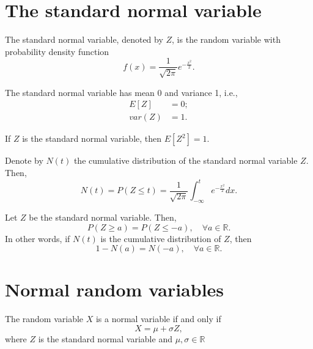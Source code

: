 \section{The standard normal variable}
The standard normal variable, denoted by $ Z $, is the random variable with
    probability density function
\begin{equation}
    f(x) = \frac{1}{\sqrt{2 \pi}} e^{-\frac{x^2}{2}}.
    \label{eq:standard-pdf}
\end{equation}

\begin{lemma}
    The standard normal variable has mean 0 and variance 1, i.e.,
    \begin{align}
        E[Z] &= 0; \label{eq:standard-expected-value} \\
        var(Z) &= 1. \label{eq:standard-variance}
    \end{align}
\end{lemma}

\begin{lemma}
    If $ Z $ is the standard normal variable, then $ E[Z^2] = 1 $.
\end{lemma}

\begin{definition}
    Denote by $ N(t) $ the cumulative distribution of the standard normal
        variable $ Z $.
    Then,
    \begin{equation}
        N(t) = P(Z \leq t) = \frac{1}{\sqrt{2 \pi}} \int_{-\infty}^{t}
            e^{-\frac{x^2}{2}} dx.
    \end{equation}
\end{definition}

\begin{lemma}\label{lemma:standard-normal-distribution-symmetry}
    Let $ Z $ be the standard normal variable.
    Then,
    \begin{equation}
        P(Z \geq a) = P(Z \leq -a), \quad \forall a \in \mathbb{R}.
    \end{equation}
    In other words, if $ N(t) $ is the cumulative distribution of $ Z $, then
    \begin{equation}
        1 - N(a) = N(-a), \quad \forall a \in \mathbb{R}.
    \end{equation}
\end{lemma}

\section{Normal random variables}
\begin{definition}
    The random variable $ X $ is a normal variable if and only if
    \begin{equation}
        X = \mu + \sigma Z,
    \end{equation}
    where $ Z $ is the standard normal variable and
        $ \mu, \sigma \in \mathbb{R} $
\end{definition}

